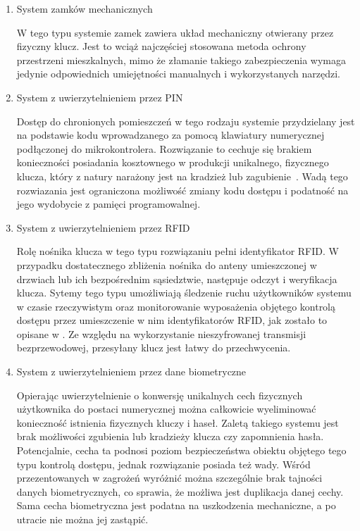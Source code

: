 		\begin{enumerate}[label=\Alph*.]
			\item System zamków mechanicznych

				W tego typu systemie zamek zawiera układ mechaniczny otwierany przez fizyczny klucz. Jest to wciąż najczęściej stosowana metoda ochrony przestrzeni mieszkalnych, mimo że złamanie takiego zabezpieczenia wymaga jedynie odpowiednich umiejętności manualnych i wykorzystanych narzędzi.

			\item System z uwierzytelnieniem przez PIN

				Dostęp do chronionych pomieszczeń w tego rodzaju systemie przydzielany jest na podstawie kodu wprowadzanego za pomocą klawiatury numerycznej podłączonej do mikrokontrolera. Rozwiązanie to cechuje się brakiem konieczności posiadania kosztownego w produkcji unikalnego, fizycznego klucza, który z natury narażony jest na kradzież lub zagubienie~\cite{keypad-access-system}. Wadą tego rozwiazania jest ograniczona możliwość zmiany kodu dostępu i podatność na jego wydobycie z pamięci programowalnej.

			\item System z uwierzytelnieniem przez RFID

				Rolę nośnika klucza w tego typu rozwiązaniu pełni identyfikator RFID. W przypadku dostatecznego zbliżenia nośnika do anteny umieszczonej w drzwiach lub ich bezpośrednim sąsiedztwie, następuje odczyt i weryfikacja klucza. Sytemy tego typu umożliwiają śledzenie ruchu użytkowników systemu w czasie rzeczywistym oraz monitorowanie wyposażenia objętego kontrolą dostępu przez umieszczenie w nim identyfikatorów RFID, jak zostało to opisane w \cite{rfid-access-system-for-university}. Ze względu na wykorzystanie nieszyfrowanej transmisji bezprzewodowej, przesyłany klucz jest łatwy do przechwycenia.

			\item System z uwierzytelnieniem przez dane biometryczne

				Opierając uwierzytelnienie o konwersję unikalnych cech fizycznych użytkownika do postaci numerycznej można całkowicie wyeliminować konieczność istnienia fizycznych kluczy i haseł. Zaletą takiego systemu jest brak możliwości zgubienia lub kradzieży klucza czy zapomnienia hasła. Potencjalnie, cecha ta podnosi poziom bezpieczeństwa obiektu objętego tego typu kontrolą dostępu, jednak rozwiązanie posiada też wady. Wśród przezentowanych w \cite{biometric-system-vulnerabilities} zagrożeń wyróżnić można szczególnie brak tajności danych biometrycznych, co sprawia, że możliwa jest duplikacja danej cechy. Sama cecha biometryczna jest podatna na uszkodzenia mechaniczne, a po utracie nie można jej zastąpić.


\end{enumerate}
